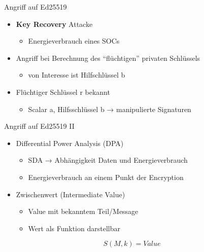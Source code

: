 \documentclass[
  10pt,
  ignorenonframetext,
  aspectratio=43,
]{beamer}
\providecommand{\tightlist}{%
  \setlength{\itemsep}{0pt}\setlength{\parskip}{0pt}}
\begin{document}
\begin{frame}{Angriff auf Ed25519}
\protect\hypertarget{angriff-auf-ed25519}{}
\begin{itemize}
\tightlist
\item
  \textbf{Key Recovery} Attacke

  \begin{itemize}
  \tightlist
  \item
    Energieverbrauch eines SOCs
  \end{itemize}
\end{itemize}

\pause

\begin{itemize}
\tightlist
\item
  Angriff bei Berechnung des ``flüchtigen'' privaten Schlüssels

  \begin{itemize}
  \tightlist
  \item
    von Interesse ist Hilfschlüssel b
  \end{itemize}
\end{itemize}

\pause

\begin{itemize}
\tightlist
\item
  Flüchtiger Schlüssel r bekannt

  \begin{itemize}
  \tightlist
  \item
    Scalar a, Hilfsschlüssel b → manipulierte Signaturen
  \end{itemize}
\end{itemize}
\end{frame}

\begin{frame}{Angriff auf Ed25519 II}
\protect\hypertarget{angriff-auf-ed25519-ii}{}
\begin{itemize}
\tightlist
\item
  Differential Power Analysis (DPA)

  \begin{itemize}
  \tightlist
  \item
    SDA → Abhängigkeit Daten und Energieverbrauch
  \item
    Energieverbrauch an einem Punkt der Encryption
  \end{itemize}
\end{itemize}

\pause

\begin{itemize}
\tightlist
\item
  Zwischenwert (Intermediate Value)

  \begin{itemize}
  \tightlist
  \item
    Value mit bekanntem Teil/Message
  \item
    Wert als Funktion darstellbar
  \end{itemize}
\end{itemize}

\pause

\[ S(M,k) = Value \]
\end{frame}
\end{document}
